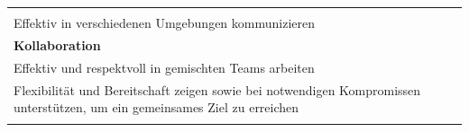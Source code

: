 \documentclass[
  ngerman,
  paper=a4,
,captions=tableheading
]{scrartcl}
\begin{document}
\begin{longtable}[]{@{}lll@{}}
\begin{minipage}[t]{0.72\columnwidth}
\end{minipage} & \begin{minipage}[t]{0.10\columnwidth}\raggedright
\strut
\end{minipage} & \begin{minipage}[t]{0.10\columnwidth}\raggedright
\strut
\end{minipage}\tabularnewline
\begin{minipage}[t]{0.72\columnwidth}\raggedright
Effektiv in verschiedenen Umgebungen kommunizieren\strut
\end{minipage} & \begin{minipage}[t]{0.10\columnwidth}\raggedright
\strut
\end{minipage} & \begin{minipage}[t]{0.10\columnwidth}\raggedright
\strut
\end{minipage}\tabularnewline
\begin{minipage}[t]{0.72\columnwidth}\raggedright
\textbf{Kollaboration}\strut
\end{minipage} & \begin{minipage}[t]{0.10\columnwidth}\raggedright
\strut
\end{minipage} & \begin{minipage}[t]{0.10\columnwidth}\raggedright
\strut
\end{minipage}\tabularnewline
\begin{minipage}[t]{0.72\columnwidth}\raggedright
Effektiv und respektvoll in gemischten Teams arbeiten\strut
\end{minipage} & \begin{minipage}[t]{0.10\columnwidth}\raggedright
\strut
\end{minipage} & \begin{minipage}[t]{0.10\columnwidth}\raggedright
\strut
\end{minipage}\tabularnewline
\begin{minipage}[t]{0.72\columnwidth}\raggedright
Flexibilität und Bereitschaft zeigen sowie bei notwendigen Kompromissen
unterstützen, um ein gemeinsames Ziel zu erreichen\strut
\end{minipage} & \begin{minipage}[t]{0.10\columnwidth}\raggedright
\strut
\end{minipage} & \begin{minipage}[t]{0.10\columnwidth}\raggedright
\strut
\end{minipage}\tabularnewline
\begin{minipage}[t]{0.72\columnwidth}\raggedright

\end{minipage}
\end{longtable}
\end{document}
